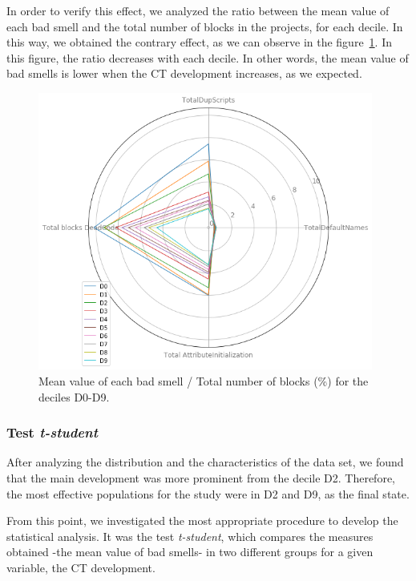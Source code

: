 In order to verify this effect, we analyzed the ratio between the mean value of each bad smell and the total number of blocks in the projects, for each decile. In this way, we obtained the contrary effect, as we can observe in the figure~\ref{fig:ratio_bad_smells_deciles}. In this figure, the ratio decreases with each decile. In other words, the mean value of bad smells is lower when the CT development increases, as we expected. 

\begin{figure}
    \centering
    \includegraphics[width=11cm,                         keepaspectratio]{img/ratio_bad_smells_deciles.png}
    \caption{Mean value of each bad smell / Total number of blocks (\%) for the deciles D0-D9.}
    \label{fig:ratio_bad_smells_deciles}
\end{figure}

\subsubsection{Test \textit{t-student}}
\label{subsubsec:test_tstudent}

After analyzing the distribution and the characteristics of the data set, we found that the main development was more prominent from the decile D2. Therefore, the most effective populations for the study were in D2 and D9, as the final state. 

From this point, we investigated the most appropriate procedure to develop the statistical analysis. It was the test \textit{t-student}, which compares the measures obtained -the mean value of bad smells- in two different groups for a given variable, the CT development.

